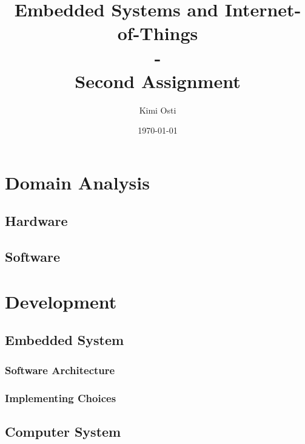 \documentclass[a4paper,12pt]{report}
\title{Embedded Systems and Internet-of-Things \\ - \\ Second Assignment}
\author{Kimi Osti}
\date{\today}
\begin{document}
	
	\maketitle
	
	\begin{abstract}
		
	\end{abstract}
	
	\tableofcontents
	
	\chapter{Domain Analysis}
	
	\section{Hardware}
	
	\section{Software}
	
	\chapter{Development}
	
	\section{Embedded System}
	
	\subsection{Software Architecture}
	
	\subsection{Implementing Choices}
	
	\section{Computer System}
	
\end{document}
